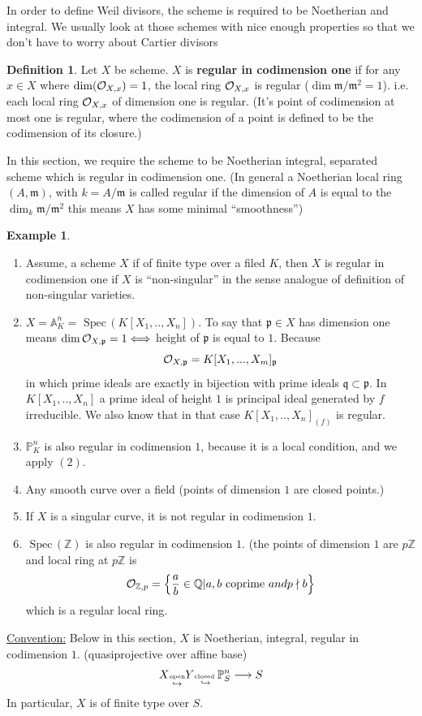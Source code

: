\documentclass[11pt]{article}
\theoremstyle{definition}
\newtheorem{dfn}[thm]{Definition}
\newtheorem{ex}[thm]{Example}
\newcommand{\spec}{\text{ Spec}\,}
\newcommand{\affn}{\mathbb A}
\newcommand{\proj}{\mathbb P}
\newcommand{\intg}{\mathbb Z}
\newcommand{\ratl}{\mathbb Q}
\newcommand{\scm}{{\mathfrak m}}
\newcommand{\scp}{{\mathfrak p}}
\newcommand{\scq}{\mathfrak q}
\newcommand{\calo}{{\cal O}}
\newcommand{\lrta}{\longrightarrow}
\newcommand{\Llrta}{\Longleftrightarrow}
\newcommand{\inj}{\hookrightarrow}
\begin{document}
In order to define Weil divisors, the scheme is required to be Noetherian and integral. We usually look at those schemes with nice enough properties so that we don't have to worry about Cartier divisors
\begin{dfn}
Let $X$ be scheme. $X$ is \textbf{regular in codimension one} if for any $x\in X$ where $\dim(\calo_{X,x})=1$, the local ring $\calo_{X,x}$ is regular ($\dim \scm/\scm^2=1$). i.e. each local ring $\calo_{X,x}$ of dimension one is regular. (It's point of codimension at most one is regular, where the codimension of a point is defined to be the codimension of its closure.)
\end{dfn}

In this section, we require the scheme to be Noetherian integral, separated scheme which is regular in codimension one.
(In general a Noetherian local ring $(A,\scm)$, with $k=A/\scm$ is called regular if the dimension of $A$ is equal to the $\dim_k \scm/\scm^2$  this means $X$ has some minimal ``smoothness'')
\begin{ex}
\ \begin{enumerate}[label=(\arabic*)]
\item Assume, a scheme $X$ if of finite type over a filed $K$, then $X$ is regular in codimension one  if $X$ is ``non-singular'' in the sense analogue of definition of non-singular varieties.
\item $X=\affn_K^n=\spec(K[X_1,..,X_n])$. To say that $\scp\in X$ has dimension one means $\dim \calo_{X,\scp}=1\Llrta $ height of $\scp$ is equal to $1$. Because
$$
\calo_{X,\scp}=K[X_1,...,X_m]_{\scp} 
$$
in which prime ideals are exactly in bijection with prime ideals $\scq\subset \scp$. In $K[X_1,..,X_n]$ a prime ideal of height $1$ is principal ideal generated by $f$ irreducible. We also know that in that case $K[X_1,..,X_n]_{(f)}$ is regular.
\item $\proj^n_K$ is also regular in codimension $1$, because it is a local condition, and we apply $(2)$.
\item Any smooth curve over a field (points of dimension $1$ are closed points.)
\item If $X$ is a singular curve, it is not regular in codimension $1$.
\item $\spec(\intg)$ is also regular in codimension $1$. (the points of dimension $1$ are $p\intg$ and local ring  at $p\intg$ is 
$$
\calo_{\intg,p}=\left\{\frac{a}{b}\in \ratl| a,b \text{ coprime } and p\nmid b\right\}
$$
which is a regular local ring.
\end{enumerate}
\end{ex}
\underline{Convention:} Below in this section, $X$ is Noetherian, integral, regular in codimension $1$. (quasiprojective over affine base)
$$
X\underset{\inj}{\text{\tiny open}} Y\underset{\inj}{\text{\tiny closed }} \proj^n_S\lrta S
$$
In particular, $X$ is of finite type over $S$.
\end{document}
